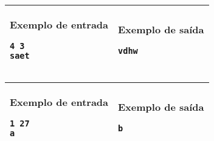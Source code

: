 \begin{table}[!h]
\centering
\begin{tabular}{|l|l|}
\hline
\begin{minipage}[t]{3in}
\textbf{Exemplo de entrada}
\begin{verbatim}
4 3
saet
\end{verbatim}
\vspace{1mm}
\end{minipage}
&
\begin{minipage}[t]{3in}
\textbf{Exemplo de saída}
\begin{verbatim}
vdhw
\end{verbatim}
\vspace{1mm}
\end{minipage} \\
\hline
\end{tabular}
\end{table}

\begin{table}[!h]
\centering
\begin{tabular}{|l|l|}
\hline
\begin{minipage}[t]{3in}
\textbf{Exemplo de entrada}
\begin{verbatim}
1 27
a
\end{verbatim}
\vspace{1mm}
\end{minipage}
&
\begin{minipage}[t]{3in}
\textbf{Exemplo de saída}
\begin{verbatim}
b
\end{verbatim}
\vspace{1mm}
\end{minipage} \\
\hline
\end{tabular}
\end{table}
